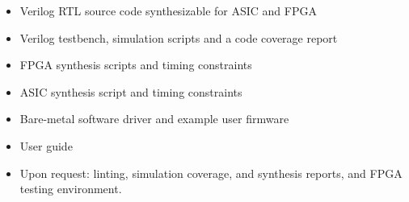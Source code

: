 \begin{itemize}
  \itemsep-0.5em
\item Verilog RTL source code synthesizable for ASIC and FPGA
\item Verilog testbench, simulation scripts and a code coverage report
\item FPGA synthesis scripts  and timing constraints
\item ASIC synthesis script and timing constraints
\item Bare-metal software driver and example user firmware
\item User guide
\item Upon request: linting, simulation coverage, and synthesis reports, and FPGA testing environment.
\end{itemize}
